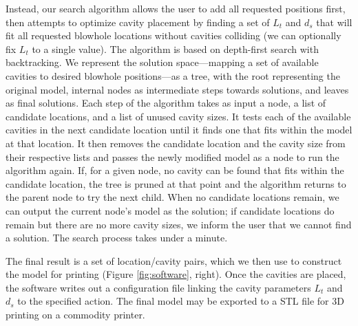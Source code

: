       Instead, our search algorithm allows the user to add all requested
      positions first, then attempts to optimize cavity placement by finding a
      set of $L_t$ and $d_s$ that will fit all requested blowhole locations
      without cavities colliding (we can optionally fix $L_t$ to a single
      value). The algorithm is based on depth-first search with backtracking. We
      represent the solution space---mapping a set of available cavities to
      desired blowhole positions---as a tree, with the root representing the
      original model, internal nodes as intermediate steps towards solutions,
      and leaves as final solutions. Each step of the algorithm takes as input a
      node, a list of candidate locations, and a list of unused cavity sizes. It
      tests each of the available cavities in the next candidate location until
      it finds one that fits within the model at that location. It then removes
      the candidate location and the cavity size from their respective lists and
      passes the newly modified model as a node to run the algorithm again. If,
      for a given node, no cavity can be found that fits within the candidate
      location, the tree is pruned at that point and the algorithm returns to
      the parent node to try the next child. When no candidate locations remain,
      we can output the current node's model as the solution; if candidate
      locations do remain but there are no more cavity sizes, we inform the user
      that we cannot find a solution. The search process takes under a minute.
          
      The final result is a set of location/cavity pairs, which we then use to
      construct the model for printing (Figure \ref{fig:software}, right). Once the
      cavities are placed, the software writes out a configuration file linking
      the cavity parameters $L_t$ and $d_s$ to the specified action. The final
      model may be exported to a STL file for 3D printing on a commodity
      printer.
          
      \begin{figure*}
        \centering
        \qquad
        \qquad
        \caption{(\protect{},\protect{}):
        Detail view of our \bh design software, based on Meshmixer.
        \protect{} shows the software with the user
        inserting blowholes: clicking a point on the model results
        in a placeholder (green dot) and a dialog box where the user
        can specify the action to be taken upon blowing.
        \protect{} shows the interior of the model,
        illustrating the different-sized cavities the software
        inserted. \protect{} shows the final
        3D-printed object with blowholes embedded.}
        \label{fig:software}
      \end{figure*}
          

